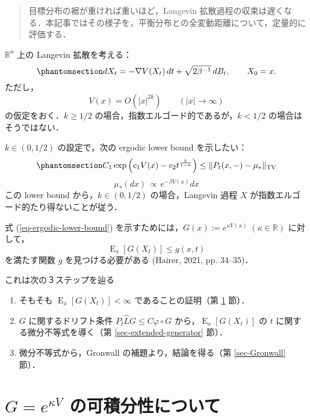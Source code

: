 \documentclass[
]{article}
\subtitle{Ergodic Lower Bounds}
\author{司馬博文}
\date{7/05/2024}
\providecommand{\tightlist}{%
  \setlength{\itemsep}{0pt}\setlength{\parskip}{0pt}}\usepackage{longtable,booktabs,array}
\renewcommand{\labelenumi}{(\arabic{enumi})} %
\begin{document}
\maketitle
\begin{abstract}
目標分布の裾が重ければ重いほど，Langevin
拡散過程の収束は遅くなる．本記事ではその様子を，平衡分布との全変動距離について，定量的に評価する．
\end{abstract}

\(\mathbb{R}^n\) 上の Langevin 拡散を考える：
\begin{equation}\phantomsection\label{eq-Langevin}{
dX_t=-\nabla V(X_t)\,dt+\sqrt{2\beta^{-1}}\,dB_t,\qquad X_0=x.
}\end{equation} ただし， \[
V(x)=O(\lvert x\rvert^{2k})\qquad(\lvert x\rvert\to\infty)
\] の仮定をおく．\(k\ge1/2\) の場合，指数エルゴード的であるが，\(k<1/2\)
の場合はそうではない．

\(k\in(0,1/2)\) の設定で，次の ergodic lower bound を示したい：
\begin{equation}\phantomsection\label{eq-ergodic-lower-bound}{
C_1\exp\left(c_1V(x)-c_2t^{\frac{k}{1-k}}\right)\le\|P_t(x,-)-\mu_*\|_\mathrm{TV}
}\end{equation} \[
\mu_*(dx)\,\propto\,e^{-\beta V(x)}dx
\] この lower bound から，\(k\in(0,1/2)\) の場合，Langevin 過程 \(X\)
が指数エルゴード的たり得ないことが従う．

式 (\ref{eq-ergodic-lower-bound})
を示すためには，\(G(x):=e^{\kappa V(x)}\;(\kappa\in\mathbb{R})\)
に対して， \[
\operatorname{E}_x[G(X_t)]\le g(x,t)
\] を満たす関数 \(g\) を見つける必要がある (Hairer, 2021, pp. 34--35)．

これは次の３ステップを辿る

\begin{enumerate}
\def\labelenumi{\arabic{enumi}.}
\tightlist
\item
  そもそも \(\operatorname{E}_x[G(X_t)]<\infty\) であることの証明（第
  \ref{sec-integrability} 節）．
\item
  \(G\) に関するドリフト条件 \(P_t\widehat{L}G\le C\varphi\circ G\)
  から，\(\operatorname{E}_x[G(X_t)]\) の \(t\)
  に関する微分不等式を導く（第 \ref{sec-extended-generator} 節）．
\item
  微分不等式から，Gronwall の補題より，結論を得る（第 \ref{sec-Gronwall}
  節）．
\end{enumerate}

\section{\texorpdfstring{\(G=e^{\kappa V}\)
の可積分性について}{G=e\^{}\{\textbackslash kappa V\} の可積分性について}}\label{sec-integrability}
\end{document}
